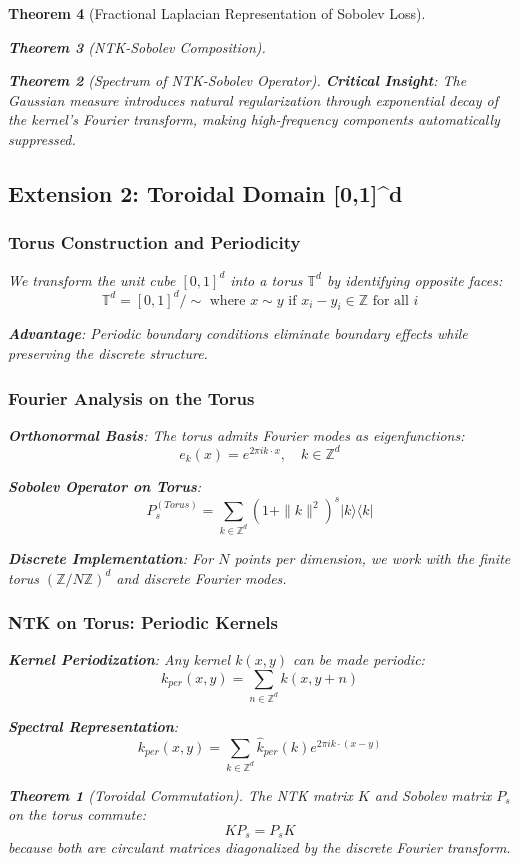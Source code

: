 \documentclass{article}
\newtheorem{theorem}{Theorem}[section]
\begin{document}
\begin{theorem}[Fractional Laplacian Representation of Sobolev Loss]
\begin{theorem}[NTK-Sobolev Composition]
\begin{theorem}[Spectrum of NTK-Sobolev Operator]
\textbf{Critical Insight}: The Gaussian measure introduces natural regularization through exponential decay of the kernel's Fourier transform, making high-frequency components automatically suppressed.

\subsection{Extension 2: Toroidal Domain [0,1]^d}

\subsubsection{Torus Construction and Periodicity}

We transform the unit cube $[0,1]^d$ into a torus $\mathbb{T}^d$ by identifying opposite faces:
\[ \mathbb{T}^d = [0,1]^d / \sim \text{ where } x \sim y \text{ if } x_i - y_i \in \mathbb{Z} \text{ for all } i \]

\textbf{Advantage}: Periodic boundary conditions eliminate boundary effects while preserving the discrete structure.

\subsubsection{Fourier Analysis on the Torus}

\textbf{Orthonormal Basis}: The torus admits Fourier modes as eigenfunctions:
\[ e_k(x) = e^{2\pi i k \cdot x}, \quad k \in \mathbb{Z}^d \]

\textbf{Sobolev Operator on Torus}:
\[ P_s^{(Torus)} = \sum_{k \in \mathbb{Z}^d} (1 + \|k\|^2)^s |k\rangle\langle k| \]

\textbf{Discrete Implementation}:
For $N$ points per dimension, we work with the finite torus $(\mathbb{Z}/N\mathbb{Z})^d$ and discrete Fourier modes.

\subsubsection{NTK on Torus: Periodic Kernels}

\textbf{Kernel Periodization}: Any kernel $k(x,y)$ can be made periodic:
\[ k_{per}(x,y) = \sum_{n \in \mathbb{Z}^d} k(x, y + n) \]

\textbf{Spectral Representation}:
\[ k_{per}(x,y) = \sum_{k \in \mathbb{Z}^d} \hat{k}_{per}(k) e^{2\pi i k \cdot (x-y)} \]

\begin{theorem}[Toroidal Commutation]
The NTK matrix $K$ and Sobolev matrix $P_s$ on the torus commute:
\[ KP_s = P_sK \]
because both are circulant matrices diagonalized by the discrete Fourier transform.
\end{theorem}


\end{theorem}
\end{theorem}
\end{theorem}
\end{document}

